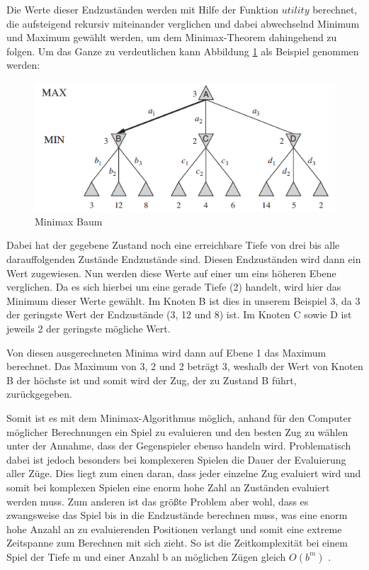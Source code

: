 Die Werte dieser Endzuständen werden mit Hilfe der Funktion $utility$ berechnet, die aufsteigend rekursiv miteinander verglichen und dabei abwechselnd Minimum und Maximum gewählt werden, um dem Minimax-Theorem dahingehend zu folgen. Um das Ganze zu verdeutlichen kann Abbildung \ref{fig:minimax_tree} als Beispiel genommen werden:

\begin{figure}[h]
\centering
\includegraphics[width=\textwidth/5*4]{images/minimax_algorithm_tree.PNG}

\caption{Minimax Baum \cite{Russell2010}}\label{fig:minimax_tree}
\end{figure}

Dabei hat der gegebene Zustand noch eine erreichbare Tiefe von drei bis alle darauffolgenden Zustände Endzustände sind. Diesen Endzuständen wird dann ein Wert zugewiesen. Nun werden diese Werte auf einer um eins höheren Ebene verglichen. Da es sich hierbei um eine gerade Tiefe (2) handelt, wird hier das Minimum dieser Werte gewählt. Im Knoten B ist dies in unserem Beispiel 3, da 3 der geringste Wert der Endzustände (3, 12 und 8) ist. Im Knoten C sowie D ist jeweils 2 der geringste mögliche Wert. 

Von diesen ausgerechneten Minima wird dann auf Ebene 1 das Maximum berechnet. Das Maximum von 3, 2 und 2 beträgt 3, weshalb der Wert von Knoten B der höchste ist und somit wird der Zug, der zu Zustand B führt, zurückgegeben.

Somit ist es mit dem Minimax-Algorithmus möglich, anhand für den Computer möglicher Berechnungen ein Spiel zu evaluieren und den besten Zug zu wählen unter der Annahme, dass der Gegenspieler ebenso handeln wird. Problematisch dabei ist jedoch besonders bei komplexeren Spielen die Dauer der Evaluierung aller Züge. Dies liegt zum einen daran, dass jeder einzelne Zug evaluiert wird und somit bei komplexen Spielen eine enorm hohe Zahl an Zuständen evaluiert werden muss. Zum anderen ist das größte Problem aber wohl, dass es zwangsweise das Spiel bis in die Endzustände berechnen muss, was eine enorm hohe Anzahl an zu evaluierenden Positionen verlangt und somit eine extreme Zeitspanne zum Berechnen mit sich zieht. So ist die Zeitkomplexität bei einem Spiel der Tiefe m und einer Anzahl b an möglichen Zügen gleich $O(b^m)$ \cite[S.169]{Russell2010}.


